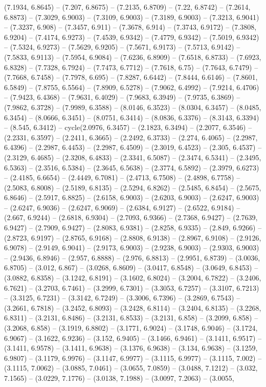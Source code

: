 (7.1934, 6.8645) -- (7.207, 6.8675) -- (7.2135, 6.8709) -- (7.22, 6.8742) -- (7.2614, 6.8873) -- (7.3029, 6.9003) -- (7.3109, 6.9003) -- (7.3189, 6.9003) -- (7.3213, 6.9041) -- (7.3237, 6.908) -- (7.3457, 6.911) -- (7.3678, 6.914) -- (7.3743, 6.9172) -- (7.3808, 6.9204) -- (7.4174, 6.9273) -- (7.4539, 6.9342) -- (7.4779, 6.9342) -- (7.5019, 6.9342) -- (7.5324, 6.9273) -- (7.5629, 6.9205) -- (7.5671, 6.9173) -- (7.5713, 6.9142) -- (7.5833, 6.9113) -- (7.5954, 6.9084) -- (7.6236, 6.8909) -- (7.6518, 6.8733) -- (7.6923, 6.8328) -- (7.7328, 6.7924) -- (7.7473, 6.7712) -- (7.7618, 6.75) -- (7.7643, 6.7479) -- (7.7668, 6.7458) -- (7.7978, 6.695) -- (7.8287, 6.6442) -- (7.8444, 6.6146) -- (7.8601, 6.5849) -- (7.8755, 6.5564) -- (7.8909, 6.5278) -- (7.9062, 6.4992) -- (7.9214, 6.4706) -- (7.9423, 6.4368) -- (7.9631, 6.4029) -- (7.9683, 6.3949) -- (7.9735, 6.3869) -- (7.9862, 6.3728) -- (7.9989, 6.3588) -- (8.0146, 6.3523) -- (8.0304, 6.3457) -- (8.0485, 6.3454) -- (8.0666, 6.3451) -- (8.0751, 6.3414) -- (8.0836, 6.3376) -- (8.3143, 6.3394) -- (8.545, 6.3412) -- cycle(2.0976, 6.3457) -- (2.1823, 6.3494) -- (2.2077, 6.3546) -- (2.2331, 6.3597) -- (2.2411, 6.3665) -- (2.2492, 6.3733) -- (2.274, 6.4065) -- (2.2987, 6.4396) -- (2.2987, 6.4453) -- (2.2987, 6.4509) -- (2.3019, 6.4523) -- (2.305, 6.4537) -- (2.3129, 6.4685) -- (2.3208, 6.4833) -- (2.3341, 6.5087) -- (2.3474, 6.5341) -- (2.3495, 6.5363) -- (2.3516, 6.5384) -- (2.3645, 6.5638) -- (2.3774, 6.5892) -- (2.3979, 6.6273) -- (2.4185, 6.6654) -- (2.4449, 6.7081) -- (2.4713, 6.7508) -- (2.4898, 6.7758) -- (2.5083, 6.8008) -- (2.5189, 6.8135) -- (2.5294, 6.8262) -- (2.5485, 6.8454) -- (2.5675, 6.8646) -- (2.5917, 6.8825) -- (2.6158, 6.9003) -- (2.6203, 6.9003) -- (2.6247, 6.9003) -- (2.6247, 6.9036) -- (2.6247, 6.9069) -- (2.6384, 6.9127) -- (2.6522, 6.9184) -- (2.667, 6.9244) -- (2.6818, 6.9304) -- (2.7093, 6.9366) -- (2.7368, 6.9427) -- (2.7639, 6.9427) -- (2.7909, 6.9427) -- (2.8083, 6.9381) -- (2.8258, 6.9335) -- (2.849, 6.9266) -- (2.8723, 6.9197) -- (2.8765, 6.9168) -- (2.8808, 6.9138) -- (2.8967, 6.9108) -- (2.9126, 6.9078) -- (2.9149, 6.9041) -- (2.9173, 6.9003) -- (2.9238, 6.9003) -- (2.9303, 6.9003) -- (2.9436, 6.8946) -- (2.957, 6.8888) -- (2.976, 6.8813) -- (2.9951, 6.8739) -- (3.0036, 6.8705) -- (3.012, 6.867) -- (3.0268, 6.8609) -- (3.0417, 6.8548) -- (3.0649, 6.8453) -- (3.0882, 6.8358) -- (3.1242, 6.8191) -- (3.1602, 6.8024) -- (3.2004, 6.7822) -- (3.2406, 6.7621) -- (3.2703, 6.7461) -- (3.2999, 6.7301) -- (3.3053, 6.7257) -- (3.3107, 6.7213) -- (3.3125, 6.7231) -- (3.3142, 6.7249) -- (3.3006, 6.7396) -- (3.2869, 6.7543) -- (3.2661, 6.7818) -- (3.2452, 6.8093) -- (3.2428, 6.8114) -- (3.2404, 6.8135) -- (3.2268, 6.8311) -- (3.2131, 6.8486) -- (3.2131, 6.8533) -- (3.2131, 6.858) -- (3.2099, 6.858) -- (3.2068, 6.858) -- (3.1919, 6.8802) -- (3.1771, 6.9024) -- (3.1748, 6.9046) -- (3.1724, 6.9067) -- (3.1622, 6.9236) -- (3.152, 6.9405) -- (3.1466, 6.9461) -- (3.1411, 6.9517) -- (3.1411, 6.9578) -- (3.1411, 6.9638) -- (3.1376, 6.9638) -- (3.134, 6.9638) -- (3.1259, 6.9807) -- (3.1179, 6.9976) -- (3.1147, 6.9977) -- (3.1115, 6.9977) -- (3.1115, 7.002) -- (3.1115, 7.0062) -- (3.0885, 7.0461) -- (3.0655, 7.0859) -- (3.0488, 7.1212) -- (3.032, 7.1565) -- (3.0229, 7.1776) -- (3.0138, 7.1988) -- (3.0097, 7.2063) -- (3.0055, 